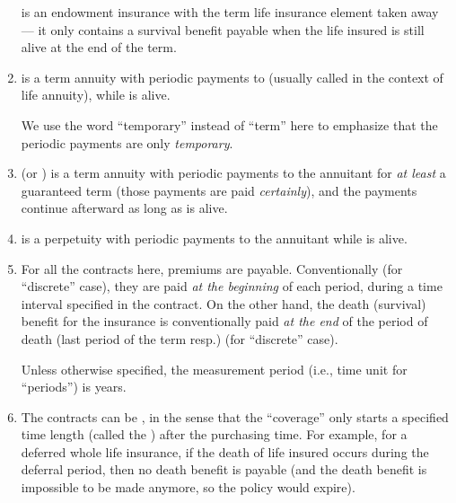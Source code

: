 \begin{enumerate}
\begin{note}
 is an endowment insurance with the term life insurance
element taken away --- it only contains a survival benefit payable when the
life insured is still alive at the end of the term.
\end{note}

\item {} is a term  annuity with periodic
payments  to  (usually called
 in the context of life annuity), while  is alive.

\begin{note}
We use the word ``temporary'' instead of ``term'' here to emphasize that the periodic payments are only \emph{temporary}.
\end{note}

\item {} (or ) is a term
 annuity with periodic payments  to
the annuitant  for \emph{at least} a guaranteed 
term (those payments are paid \emph{certainly}), and the payments continue
afterward as long as  is alive.

\item {} is a perpetuity with periodic payments
 to the annuitant  while  is
alive.

\item \label{it:prem-ben-conventions}
For all the contracts here, premiums  are payable.
Conventionally (for ``discrete'' case), they are paid \emph{at the beginning}
of each period, during a time interval specified in the contract.  On the other
hand, the death (survival) benefit for the insurance is conventionally paid
\emph{at the end} of the period of death (last period of the term resp.) (for
``discrete'' case).

\begin{note}
Unless otherwise specified, the measurement period (i.e., time unit for
``periods'') is years.
\end{note}

\item \label{it:deferral} The contracts can be , in the sense
that the ``coverage'' only starts a specified time length (called the
) after the purchasing time. For example, for a deferred
whole life insurance, if the death of life insured  occurs during
the deferral period, then no death benefit is payable (and the death benefit is
impossible to be made anymore, so the policy would expire).


\end{enumerate}
